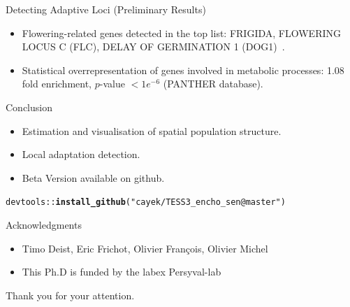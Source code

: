 \documentclass{beamer}\usepackage[]{graphicx}\usepackage[]{color}
\makeatletter
\newcommand{\hlstr}[1]{\textcolor[rgb]{0.192,0.494,0.8}{#1}}%
\newcommand{\hlopt}[1]{\textcolor[rgb]{0,0,0}{#1}}%
\newcommand{\hlstd}[1]{\textcolor[rgb]{0.345,0.345,0.345}{#1}}%
\newcommand{\hlkwd}[1]{\textcolor[rgb]{0.737,0.353,0.396}{\textbf{#1}}}%
\newenvironment{kframe}{%
 \def\at@end@of@kframe{}%
 \ifinner\ifhmode%
  \def\at@end@of@kframe{\end{minipage}}%
  \begin{minipage}{\columnwidth}%
 \fi\fi%
 \def\FrameCommand##1{\hskip\@totalleftmargin \hskip-\fboxsep
 \colorbox{shadecolor}{##1}\hskip-\fboxsep
     \hskip-\linewidth \hskip-\@totalleftmargin \hskip\columnwidth}%
 \MakeFramed {\advance\hsize-\width
   \@totalleftmargin\z@ \linewidth\hsize
   \@setminipage}}%
 {\par\unskip\endMakeFramed%
 \at@end@of@kframe}
\newenvironment{knitrout}{}{} %
\makeatother
\begin{document}

\begin{frame}{Detecting Adaptive Loci (Preliminary Results)}
\begin{itemize}
  \item Flowering-related genes detected in the top list: FRIGIDA, FLOWERING LOCUS C (FLC), 
  DELAY OF GERMINATION 1 (DOG1)~\citep{horton2012genome}.
  \item Statistical overrepresentation of genes involved in metabolic processes: 
  1.08 fold enrichment, $p$-value $< 1e^{-6}$ (PANTHER database).
\end{itemize}
  
\end{frame}



\begin{frame}[fragile]{Conclusion}

\begin{itemize}
  \item Estimation and visualisation of spatial population structure.
  \item Local adaptation detection.
  \item Beta Version available on github.

\end{itemize}

  
\begin{knitrout}
\color{fgcolor}\begin{kframe}
\begin{alltt}
\hlstd{devtools}\hlopt{::}\hlkwd{install_github}\hlstd{(}\hlstr{"cayek/TESS3_encho_sen@master"}\hlstd{)}
\end{alltt}
\end{kframe}
\end{knitrout}

\end{frame}


\begin{frame}{Acknowledgments}
\begin{itemize}
  \item Timo Deist, Eric Frichot, Olivier Fran\c cois, Olivier Michel 
  \item This Ph.D is funded by the labex Persyval-lab
\end{itemize}

\begin{center}
\Huge \alert{Thank you for your attention.}
\end{center}

\end{frame}
\end{document}
